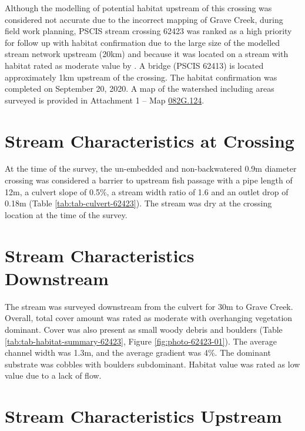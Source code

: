 \documentclass[
]{book}
\begin{document}
Although the modelling of potential habitat upstream of this crossing was considered not accurate due to the incorrect mapping of Grave Creek, during field work planning, PSCIS stream crossing 62423 was ranked as a high priority for follow up with habitat confirmation due to the large size of the modelled stream network upstream (20km) and because it was located on a stream with habitat rated as moderate value by \citet{vastFishPassage2013}. A bridge (PSCIS 62413) is located approximately 1km upstream of the crossing. The habitat confirmation was completed on September 20, 2020. A map of the watershed including areas surveyed is provided in Attachment 1 -- Map \href{https://hillcrestgeo.ca/outgoing/fishpassage/projects/elk/FishPassage_082G.124.pdf}{082G.124}.

\hypertarget{stream-characteristics-at-crossing-3}{%
\section*{Stream Characteristics at Crossing}\label{stream-characteristics-at-crossing-3}}

At the time of the survey, the un-embedded and non-backwatered 0.9m diameter crossing was considered a barrier to upstream fish passage with a pipe length of 12m, a culvert slope of 0.5\%, a stream width ratio of 1.6 and an outlet drop of 0.18m (Table \ref{tab:tab-culvert-62423}). The stream was dry at the crossing location at the time of the survey.

\hypertarget{stream-characteristics-downstream-3}{%
\section*{Stream Characteristics Downstream}\label{stream-characteristics-downstream-3}}

The stream was surveyed downstream from the culvert for 30m to Grave Creek. Overall, total cover amount was rated as moderate with overhanging vegetation dominant. Cover was also present as small woody debris and boulders (Table \ref{tab:tab-habitat-summary-62423}, Figure \ref{fig:photo-62423-01}). The average channel width was 1.3m, and the average gradient was 4\%. The dominant substrate was cobbles with boulders subdominant. Habitat value was rated as low value due to a lack of flow.

\hypertarget{stream-characteristics-upstream-3}{%
\section*{Stream Characteristics Upstream}\label{stream-characteristics-upstream-3}}
\end{document}
